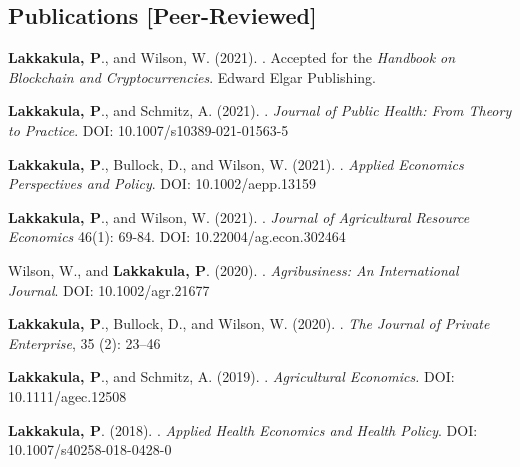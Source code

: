 \documentclass[margin,line]{res}
\begin{document}
\begin{resume}
\section{\sc Publications [Peer-Reviewed]}
\begin{etaremune}
\item {\bf Lakkakula, P}., and Wilson, W. (2021). . Accepted for the {\em Handbook on Blockchain and Cryptocurrencies}. Edward Elgar Publishing.
\item {\bf Lakkakula, P}., and Schmitz, A. (2021). \href{https://link.springer.com/article/10.1007/s10389-021-01563-5}{}. {\em Journal of Public Health: From Theory to Practice}. DOI: 10.1007/s10389-021-01563-5
\item {\bf Lakkakula, P}., Bullock, D., and Wilson, W. (2021). \href{https://onlinelibrary.wiley.com/doi/full/10.1002/aepp.13159}{}. {\em Applied Economics Perspectives and Policy}. DOI: 10.1002/aepp.13159
\item {\bf Lakkakula, P}., and Wilson, W. (2021). \href{https://jareonline.org/articles/origin-and-export-basis-interdependencies-with-shipping-costs-in-soybeans-a-panel-data-analysis/}{}. {\em Journal of Agricultural Resource Economics} 46(1): 69-84. DOI: 10.22004/ag.econ.302464
\item Wilson, W., and {\bf Lakkakula, P}. (2020). \href{https://onlinelibrary.wiley.com/doi/epdf/10.1002/agr.21677}{}. {\em Agribusiness: An International Journal}. DOI: 10.1002/agr.21677
\item {\bf Lakkakula, P}., Bullock, D., and Wilson, W. (2020). \href{http://journal.apee.org/index.php?title=2020_Journal_of_Private_Enterprise_Vol_35_No_2_Summer_parte2}{}. {\em The Journal of Private Enterprise}, 35 (2): 23–46
\item {\bf Lakkakula, P}., and Schmitz, A. (2019). \href{https://onlinelibrary.wiley.com/doi/abs/10.1111/agec.12508}{}. {\em Agricultural Economics.} DOI: 10.1111/agec.12508
\item {\bf Lakkakula, P}. (2018). \href{https://link.springer.com/epdf/10.1007/s40258-018-0428-0?author_access_token=sWdknSJCh89sfamSsPgKT_e4RwlQNchNByi7wbcMAY5M4LnkKpqHSlTMybi_OnBvBzVrtJ1vWi01PyaDmi4iF7M18K1EP9H22xlDmwiMjKx8lzItv7GENUBvy8_9wxGJi5uGP_9bfILxv4BNkvDnEA%3D%3D}{\say{Potential Impact of Sweetener Input Tax on Public Health}}. {\em Applied Health Economics and Health Policy}. DOI: 10.1007/s40258-018-0428-0

\end{etaremune}
\end{resume}
\end{document}
